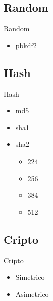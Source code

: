 \documentclass[xcolor=x11names,compress]{beamer}
\renewcommand{\(}{\begin{columns}}
\renewcommand{\)}{\end{columns}}
\newcommand{\<}[1]{\begin{column}{#1}}
\renewcommand{\>}{\end{column}}
\begin{document}
\subsection{Random}
\begin{frame}{Random}
    \begin{center}
        \begin{itemize}
            \item pbkdf2
        \end{itemize}
    \end{center}
\end{frame}


\subsection{Hash}
\begin{frame}{Hash}
    \begin{center}
        \begin{itemize}
            \item md5
            \item sha1
            \item sha2 
            \begin{itemize}
                \item 224
                \item 256
                \item 384
                \item 512
            \end{itemize}
        \end{itemize}
    \end{center}
\end{frame}


\subsection{Cripto}
\begin{frame}{Cripto}
    \begin{center}
        \begin{itemize}
            \item Simetrico
            \item Asimetrico
        \end{itemize}
    \end{center}

    
\end{frame}
\end{document}
